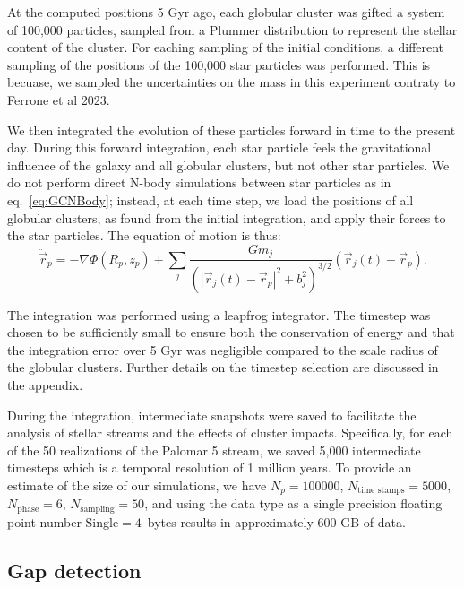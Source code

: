 \documentclass[draft]{aa}
\begin{document}
    At the computed positions 5 Gyr ago, each globular cluster was gifted a system of 100,000 particles, sampled from a Plummer distribution to represent the stellar content of the cluster. For eaching sampling of the initial conditions, a different sampling of the positions of the 100,000 star particles was performed. This is becuase, we sampled the uncertainties on the mass in this experiment contraty to Ferrone et al 2023. 
    
    We then integrated the evolution of these particles forward in time to the present day. During this forward integration, each star particle feels the gravitational influence of the galaxy and all globular clusters, but not other star particles. We do not perform direct N-body simulations between star particles as in eq.~\ref{eq:GCNBody}; instead, at each time step, we load the positions of all globular clusters, as found from the initial integration, and apply their forces to the star particles. The equation of motion is thus: 
    \begin{equation}
      \ddot{\vec{r}}_p = -\nabla \Phi(R_p,z_p) + \left.\sum_{j} \frac{Gm_j}{\left(|\vec{r}_j(t) - \vec{r}_p|^2 + b_j^2\right)^{3/2}}\right. \left(\vec{r}_j(t)- \vec{r}_p\right).
      \end{equation}

    The integration was performed using a leapfrog integrator. The timestep was chosen to be sufficiently small to ensure both the conservation of energy and that the integration error over 5 Gyr was negligible compared to the scale radius of the globular clusters. Further details on the timestep selection are discussed in the appendix.

    During the integration, intermediate snapshots were saved to facilitate the analysis of stellar streams and the effects of cluster impacts. Specifically, for each of the 50 realizations of the Palomar 5 stream, we saved 5,000 intermediate timesteps which is a temporal resolution of 1 million years. To provide an estimate of the size of our simulations, we have $N_p=100 000$, $N_\textrm{time stamps} = 5000$, $N_\textrm{phase}=6$, $N_\textrm{sampling}=50$, and using the data type as a single precision floating point number $\textrm{Single}=4$~bytes results in approximately 600 GB of data.




  \subsection{Gap detection} \label{sec:gap_detection}
\end{document}
